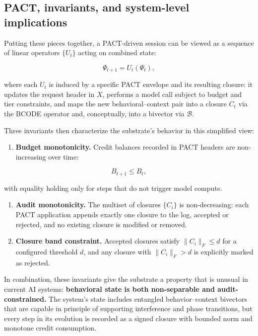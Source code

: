 \subsection{PACT, invariants, and system-level
implications}\label{pact-invariants-and-system-level-implications}

Putting these pieces together, a PACT-driven session can be viewed as a
sequence of linear operators \(\{U_t\}\) acting on combined state:

\[
\Psi_{t+1} = U_t(\Psi_t),
\]

where each \(U_t\) is induced by a specific PACT envelope and its
resulting closure: it updates the request header in \(X\), performs a
model call subject to budget and tier constraints, and maps the new
behavioral--context pair into a closure \(C_t\) via the BCODE operator
and, conceptually, into a bivector via \(\mathcal{B}\).

Three invariants then characterize the substrate's behavior in this
simplified view:

\begin{enumerate}
\def\labelenumi{\arabic{enumi}.}
\tightlist
\item
  \textbf{Budget monotonicity.} Credit balances recorded in PACT headers
  are non-increasing over time:
\end{enumerate}

\[
B_{t+1} \le B_t,
\]

with equality holding only for steps that do not trigger model compute.

\begin{enumerate}
\def\labelenumi{\arabic{enumi}.}
\setcounter{enumi}{1}
\item
  \textbf{Audit monotonicity.} The multiset of closures \(\{C_i\}\) is
  non-decreasing: each PACT application appends exactly one closure to
  the log, accepted or rejected, and no existing closure is modified or
  removed.
\item
  \textbf{Closure band constraint.} Accepted closures satisfy
  \(\|C_i\|_F \le d\) for a configured threshold \(d\), and any closure
  with \(\|C_i\|_F > d\) is explicitly marked as rejected.
\end{enumerate}

In combination, these invariants give the substrate a property that is
unusual in current AI systems: \textbf{behavioral state is both
non-separable and audit-constrained.} The system's state includes
entangled behavior--context bivectors that are capable in principle of
supporting interference and phase transitions, but every step in its
evolution is recorded as a signed closure with bounded norm and monotone
credit consumption.


